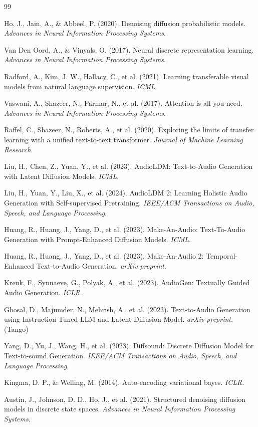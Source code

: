 \documentclass[12pt,a4paper]{article}
\begin{document}
\begin{thebibliography}{99}

 Ho, J., Jain, A., \& Abbeel, P. (2020). Denoising diffusion probabilistic models. \textit{Advances in Neural Information Processing Systems}.

 Van Den Oord, A., \& Vinyals, O. (2017). Neural discrete representation learning. \textit{Advances in Neural Information Processing Systems}.

 Radford, A., Kim, J. W., Hallacy, C., et al. (2021). Learning transferable visual models from natural language supervision. \textit{ICML}.

 Vaswani, A., Shazeer, N., Parmar, N., et al. (2017). Attention is all you need. \textit{Advances in Neural Information Processing Systems}.

 Raffel, C., Shazeer, N., Roberts, A., et al. (2020). Exploring the limits of transfer learning with a unified text-to-text transformer. \textit{Journal of Machine Learning Research}.

 Liu, H., Chen, Z., Yuan, Y., et al. (2023). AudioLDM: Text-to-Audio Generation with Latent Diffusion Models. \textit{ICML}.

 Liu, H., Yuan, Y., Liu, X., et al. (2024). AudioLDM 2: Learning Holistic Audio Generation with Self-supervised Pretraining. \textit{IEEE/ACM Transactions on Audio, Speech, and Language Processing}.

 Huang, R., Huang, J., Yang, D., et al. (2023). Make-An-Audio: Text-To-Audio Generation with Prompt-Enhanced Diffusion Models. \textit{ICML}.

 Huang, R., Huang, J., Yang, D., et al. (2023). Make-An-Audio 2: Temporal-Enhanced Text-to-Audio Generation. \textit{arXiv preprint}.

 Kreuk, F., Synnaeve, G., Polyak, A., et al. (2023). AudioGen: Textually Guided Audio Generation. \textit{ICLR}.

 Ghosal, D., Majumder, N., Mehrish, A., et al. (2023). Text-to-Audio Generation using Instruction-Tuned LLM and Latent Diffusion Model. \textit{arXiv preprint}. (Tango)

 Yang, D., Yu, J., Wang, H., et al. (2023). Diffsound: Discrete Diffusion Model for Text-to-sound Generation. \textit{IEEE/ACM Transactions on Audio, Speech, and Language Processing}.

 Kingma, D. P., \& Welling, M. (2014). Auto-encoding variational bayes. \textit{ICLR}.

 Austin, J., Johnson, D. D., Ho, J., et al. (2021). Structured denoising diffusion models in discrete state spaces. \textit{Advances in Neural Information Processing Systems}.

\end{thebibliography}
\end{document}
